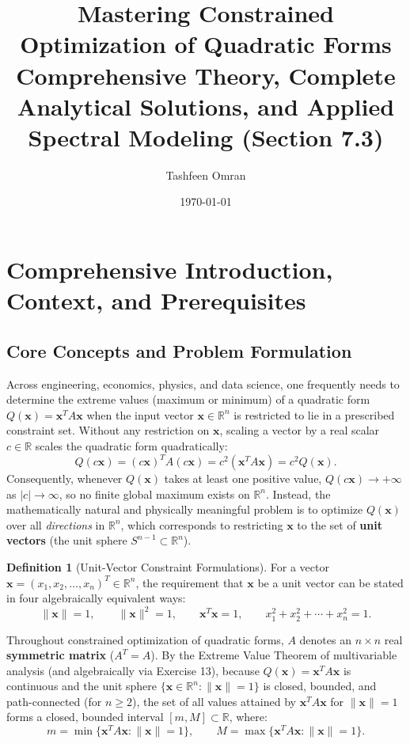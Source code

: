 \documentclass[11pt, letterpaper]{article}
\title{\textbf{Mastering Constrained Optimization of Quadratic Forms}\\
\large Comprehensive Theory, Complete Analytical Solutions, and Applied Spectral Modeling (Section 7.3)}
\author{Tashfeen Omran}
\date{\today}
\theoremstyle{definition}
\newtheorem{definition}{Definition}[section]
\theoremstyle{remark}
\begin{document}
\maketitle
\tableofcontents
\newpage

\section{Comprehensive Introduction, Context, and Prerequisites}

\subsection{Core Concepts and Problem Formulation}

Across engineering, economics, physics, and data science, one frequently needs to determine the extreme values (maximum or minimum) of a quadratic form $Q(\mathbf{x}) = \mathbf{x}^T A \mathbf{x}$ when the input vector $\mathbf{x} \in \mathbb{R}^n$ is restricted to lie in a prescribed constraint set. Without any restriction on $\mathbf{x}$, scaling a vector by a real scalar $c \in \mathbb{R}$ scales the quadratic form quadratically:
\[
Q(c\mathbf{x}) = (c\mathbf{x})^T A (c\mathbf{x}) = c^2 (\mathbf{x}^T A \mathbf{x}) = c^2 Q(\mathbf{x}).
\]
Consequently, whenever $Q(\mathbf{x})$ takes at least one positive value, $Q(c\mathbf{x}) \to +\infty$ as $|c| \to \infty$, so no finite global maximum exists on $\mathbb{R}^n$. Instead, the mathematically natural and physically meaningful problem is to optimize $Q(\mathbf{x})$ over all \emph{directions} in $\mathbb{R}^n$, which corresponds to restricting $\mathbf{x}$ to the set of \textbf{unit vectors} (the unit sphere $S^{n-1} \subset \mathbb{R}^n$).

\begin{definition}[Unit-Vector Constraint Formulations]
For a vector $\mathbf{x} = (x_1, x_2, \dots, x_n)^T \in \mathbb{R}^n$, the requirement that $\mathbf{x}$ be a unit vector can be stated in four algebraically equivalent ways:
\[
\|\mathbf{x}\| = 1, \qquad \|\mathbf{x}\|^2 = 1, \qquad \mathbf{x}^T \mathbf{x} = 1, \qquad x_1^2 + x_2^2 + \cdots + x_n^2 = 1.
\]
\end{definition}

Throughout constrained optimization of quadratic forms, $A$ denotes an $n \times n$ real \textbf{symmetric matrix} ($A^T = A$). By the Extreme Value Theorem of multivariable analysis (and algebraically via Exercise 13), because $Q(\mathbf{x}) = \mathbf{x}^T A \mathbf{x}$ is continuous and the unit sphere $\{\mathbf{x} \in \mathbb{R}^n : \|\mathbf{x}\| = 1\}$ is closed, bounded, and path-connected (for $n \ge 2$), the set of all values attained by $\mathbf{x}^T A \mathbf{x}$ for $\|\mathbf{x}\| = 1$ forms a closed, bounded interval $[m, M] \subset \mathbb{R}$, where:
\[
m = \min \{\mathbf{x}^T A \mathbf{x} : \|\mathbf{x}\| = 1\}, \qquad M = \max \{\mathbf{x}^T A \mathbf{x} : \|\mathbf{x}\| = 1\}.
\]
\end{document}
